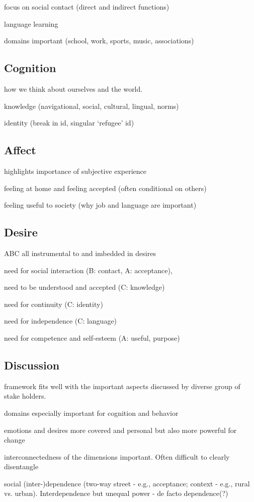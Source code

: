 \documentclass[man, 12pt, a4paper]{apa7}
\begin{document}
focus on social contact (direct and indirect functions)

language learning

domains important (school, work, sports, music, associations)

\subsection{Cognition}
how we think about ourselves and the world.

knowledge (navigational, social, cultural, lingual, norms)

identity (break in id, singular ‘refugee' id)

\subsection{Affect}
highlights importance of subjective experience

feeling at home and feeling accepted (often conditional on others)

feeling useful to society (why job and language are important)

\subsection{Desire}
ABC all instrumental to and imbedded in desires

need for social interaction (B: contact, A: acceptance),

need to be understood and accepted (C: knowledge)

need for continuity (C: identity)

need for independence (C: language)

need for competence and self-esteem (A: useful, purpose)

\subsection{Discussion}
framework fits well with the important aspects discussed by diverse group of stake holders.

domains especially important for cognition and behavior

emotions and desires more covered and personal but also more powerful for change

interconnectedness of the dimensions important. Often difficult to clearly disentangle

social (inter-)dependence (two-way street - e.g., acceptance; context - e.g., rural vs. urban). Interdependence but unequal power - de facto dependence(?)
\end{document}
